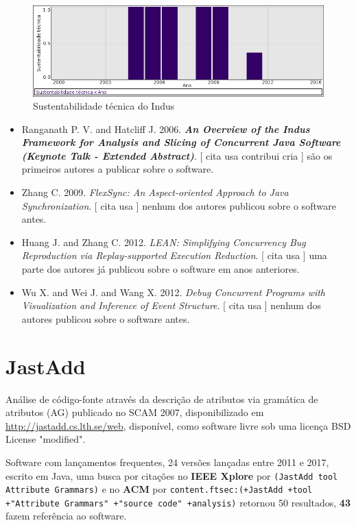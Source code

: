 \begin{figure}[h]
  \center
  \includegraphics[scale=0.50]{result-documents/charts/indus.png}
  \caption{Sustentabilidade técnica do Indus}
\end{figure}


\begin{itemize}
\item Ranganath P. V. and Hatcliff J.
      2006.
        \textbf{\textit{ An Overview of the Indus Framework for Analysis and Slicing of Concurrent Java Software (Keynote Talk - Extended Abstract)}}.
      [
          cita
          usa
          contribui
          cria
      ]
são os primeiros autores a publicar sobre o software.
\item Zhang C.
      2009.
        \textit{ FlexSync: An Aspect-oriented Approach to Java Synchronization}.
      [
          cita
          usa
      ]
nenhum dos autores publicou sobre o software antes.
\item Huang J. and Zhang C.
      2012.
        \textit{ LEAN: Simplifying Concurrency Bug Reproduction via Replay-supported Execution Reduction}.
      [
          cita
          usa
      ]
uma parte dos autores já publicou sobre o software em anos anteriores.
\item Wu X. and Wei J. and Wang X.
      2012.
        \textit{ Debug Concurrent Programs with Visualization and Inference of Event Structure}.
      [
          cita
          usa
      ]
nenhum dos autores publicou sobre o software antes.
\end{itemize}
\section{JastAdd}

Análise de código-fonte através da descrição de atributos via gramática de atributos (AG)
publicado no SCAM 2007,
disponibilizado em \url{http://jastadd.cs.lth.se/web},
disponível,
como software livre
sob uma licença BSD License "modified".

Software com lançamentos frequentes,
24 versões lançadas
entre 2011 e 2017,
escrito em Java,
uma busca por citações no {\bf IEEE Xplore} por
\texttt{(JastAdd tool Attribute Grammars)}
e no {\bf ACM} por
\texttt{content.ftsec:(+JastAdd +tool +"Attribute Grammars" +"source code" +analysis)}
retornou
50 resultados,
{\bf 43} fazem referência ao software.


